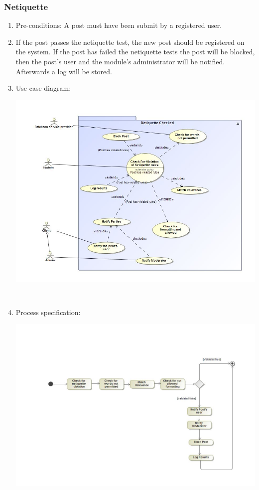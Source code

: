 \documentclass[hidelinks, 12pt, oneside]{article}
\begin{document}
\subsubsection{Netiquette}
\begin{enumerate}
 \item Pre-conditions: A post must have been submit by a registered user.

 \item If the post passes the netiquette test, the new post should be registered on the system. If the post has failed the netiquette tests the post will be blocked, then the post's user and the module's administrator will be notified. Afterwards a log will be stored.  

 \item Use case diagram:\\
  \centerline{\includegraphics[scale=0.4]{netiquetteUseCase}}\\
  \item Process specification:\\
 \centerline{\includegraphics[scale=0.35]{NetiquetteActivityDiagram}} 
\end{enumerate}
\end{document}
